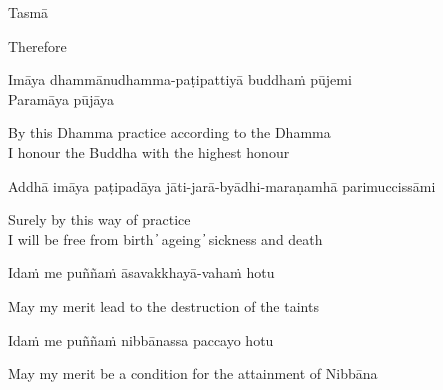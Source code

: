 
Tasmā

\begin{cprenglish}
  Therefore
\end{cprenglish}

Imāya dhammānudhamma-paṭipattiyā buddhaṁ pūjemi\\
Paramāya pūjāya

\begin{cprenglish}
  By this Dhamma practice according to the Dhamma\\
  I honour the Buddha with the highest honour
\end{cprenglish}

Addhā imāya paṭipadāya jāti-jarā-byādhi-maraṇamhā parimuccissāmi

\begin{cprenglish}
  Surely by this way of practice\\
  I will be free from birth  ̓  ageing  ̓  sickness and death
\end{cprenglish}

Idaṁ me puññaṁ āsavakkhayā-vahaṁ hotu

\begin{cprenglish}
  May my merit lead to the destruction of the taints
\end{cprenglish}

Idaṁ me puññaṁ nibbānassa paccayo hotu

\begin{cprenglish}
  May my merit be a condition for the attainment of Nibbāna
\end{cprenglish}


\clearpage
